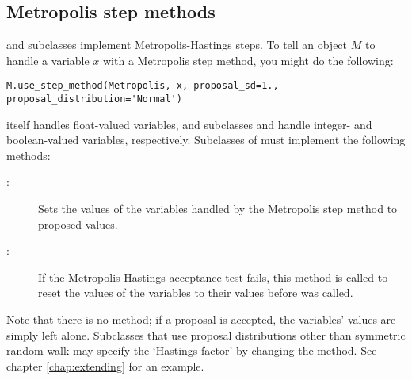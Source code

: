 \hypertarget{metropolis}{}
\subsection{Metropolis step methods} \label{metropolis}

 and subclasses implement Metropolis-Hastings steps. To tell an  object $M$ to handle a variable $x$ with a Metropolis step method, you might do the following:
\begin{verbatim}
M.use_step_method(Metropolis, x, proposal_sd=1., proposal_distribution='Normal')
\end{verbatim} 

 itself handles float-valued variables, and subclasses  and  handle integer- and boolean-valued variables, respectively. Subclasses of  must implement the following methods:
\begin{description}
    \item[:] Sets the values of the variables handled by the Metropolis step method to proposed values.
    \item[:] If the Metropolis-Hastings acceptance test fails, this method is called to reset the values of the variables to their values before  was called.
\end{description}
Note that there is no  method; if a proposal is accepted, the variables' values are simply left alone. Subclasses that use proposal distributions other than symmetric random-walk may specify the `Hastings factor' by changing the  method. See chapter \ref{chap:extending} for an example.

